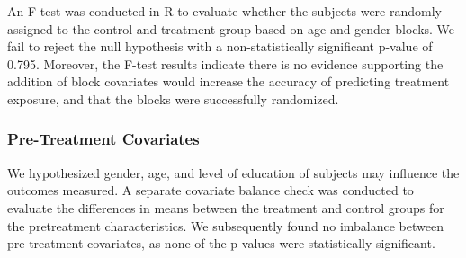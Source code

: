 \documentclass[
]{article}
\begin{document}
An F-test was conducted in R to evaluate whether the subjects were
randomly assigned to the control and treatment group based on age and
gender blocks. We fail to reject the null hypothesis with a
non-statistically significant p-value of 0.795. Moreover, the F-test
results indicate there is no evidence supporting the addition of block
covariates would increase the accuracy of predicting treatment exposure,
and that the blocks were successfully randomized.

\hypertarget{pre-treatment-covariates}{%
\subsubsection{Pre-Treatment
Covariates}\label{pre-treatment-covariates}}

We hypothesized gender, age, and level of education of subjects may
influence the outcomes measured. A separate covariate balance check was
conducted to evaluate the differences in means between the treatment and
control groups for the pretreatment characteristics. We subsequently
found no imbalance between pre-treatment covariates, as none of the
p-values were statistically significant.
\end{document}

